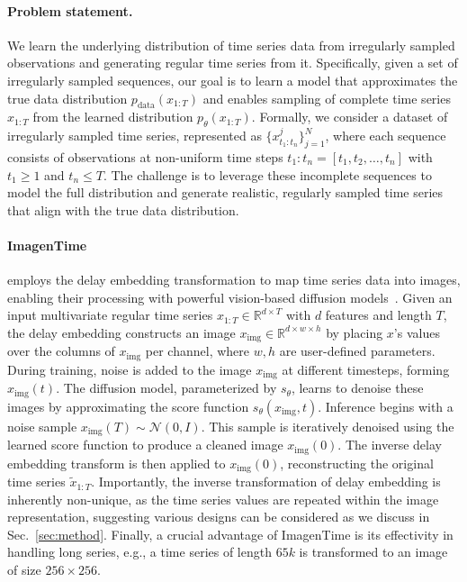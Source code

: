 \documentclass{article}
\theoremstyle{plain}
\theoremstyle{definition}
\theoremstyle{remark}
\begin{document}
\paragraph{Problem statement.} We learn the underlying distribution of time series data from irregularly sampled observations and generating regular time series from it. Specifically, given a set of irregularly sampled sequences, our goal is to learn a model that approximates the true data distribution \( p_{\text{data}}(x_{1:T}) \) and enables sampling of complete time series \( x_{1:T} \) from the learned distribution \( p_\theta(x_{1:T}) \). Formally, we consider a dataset of irregularly sampled time series, represented as \( \{ x_{t_1:t_n}^j \}_{j=1}^N \), where each sequence consists of observations at non-uniform time steps \( t_1:t_n = [t_1, t_2, \dots, t_n] \) with \( t_1 \geq 1 \) and \( t_n \leq T \). The challenge is to leverage these incomplete sequences to model the full distribution and generate realistic, regularly sampled time series that align with the true data distribution.

\vspace{-2mm}
\paragraph{ImagenTime}\hspace{-3mm} employs the delay embedding transformation to map time series data into images, enabling their processing with powerful vision-based diffusion models~\cite{naiman2024utilizing}. Given an input multivariate regular time series $x_{1:T} \in \mathbb{R}^{d \times T}$ with $d$ features and length $T$, the delay embedding constructs an image $x_\text{img} \in \mathbb{R}^{d \times w \times h}$ by placing $x$'s values over the columns of $x_\text{img}$ per channel, where $w, h$ are user-defined parameters. During training, noise is added to the image $x_\text{img}$ at different timesteps, forming $x_\text{img}(t)$. The diffusion model, parameterized by $s_\theta$, learns to denoise these images by approximating the score function $s_\theta(x_\text{img}, t)$. Inference begins with a noise sample $x_\text{img}(T) \sim \mathcal{N}(0, I)$. This sample is iteratively denoised using the learned score function to produce a cleaned image $x_\text{img}(0)$. The inverse delay embedding transform is then applied to $x_\text{img}(0)$, reconstructing the original time series $\tilde{x}_{1:T}$. Importantly, the inverse transformation of delay embedding is inherently non-unique, as the time series values are repeated within the image representation, suggesting various designs can be considered as we discuss in Sec.~\ref{sec:method}. Finally, a crucial advantage of ImagenTime is its effectivity in handling long series, e.g., a time series of length $65k$ is transformed to an image of size $256\times 256$.
\vspace{-2mm}
\end{document}
